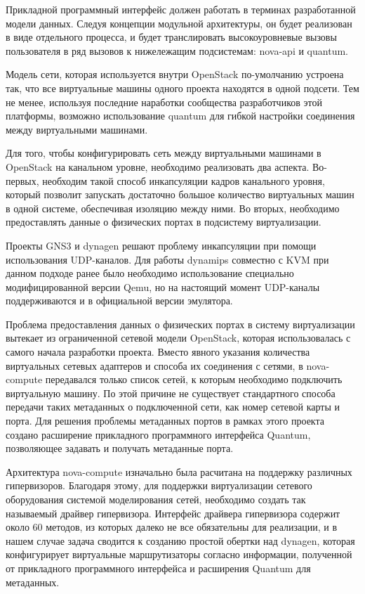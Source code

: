 Прикладной программный интерфейс должен работать в терминах разработанной модели данных.
Следуя концепции модульной архитектуры, он будет реализован в виде отдельного процесса,
и будет транслировать высокоуровневые вызовы пользователя в ряд вызовов к нижележащим
подсистемам: nova-api и quantum.

Модель сети, которая используется внутри OpenStack по-умолчанию устроена так, что 
все виртуальные машины одного проекта находятся в одной подсети. Тем не менее,
используя последние наработки сообщества разработчиков этой платформы, возможно использование
quantum для гибкой настройки соединения между виртуальными машинами.

Для того, чтобы конфигурировать сеть между виртуальными машинами в OpenStack на 
канальном уровне, необходимо реализовать два аспекта. Во-первых, необходим такой способ 
инкапсуляции кадров канального уровня, который позволит запускать достаточно большое
количество виртуальных машин в одной системе, обеспечивая изоляцию между ними.
Во вторых, необходимо предоставлять данные о физических портах в подсистему виртуализации.

Проекты GNS3 и dynagen решают проблему инкапсуляции при помощи использования UDP-каналов.
Для работы dynamips совместно с KVM при данном подходе ранее было необходимо использование 
специально модифицированной версии Qemu, но на настоящий момент UDP-каналы
поддерживаются и в официальной версии эмулятора.

Проблема предоставления данных о физических портах в систему виртуализации вытекает
из ограниченной сетевой модели OpenStack, которая использовалась с самого начала разработки
проекта. Вместо явного указания количества виртуальных сетевых адаптеров и способа их 
соединения с сетями, в nova-compute передавался только список сетей, к которым необходимо
подключить виртуальную машину. По этой причине не существует стандартного способа передачи
таких метаданных о подключенной сети, как номер сетевой карты и порта.
Для решения проблемы метаданных портов в рамках этого проекта создано расширение прикладного 
программного интерфейса Quantum, позволяющее задавать и получать метаданные порта.

Архитектура nova-compute изначально была расчитана на поддержку различных гипервизоров.
Благодаря этому, для поддержки виртуализации сетевого оборудования системой моделирования
сетей, необходимо создать так называемый драйвер гипервизора. Интерфейс драйвера гипервизора
содержит около 60 методов, из которых далеко не все обязательны для реализации, и
в нашем случае задача сводится к созданию простой обертки над dynagen, которая конфигурирует
виртуальные маршрутизаторы согласно информации, полученной от прикладного программного
интерфейса и расширения Quantum для метаданных.

